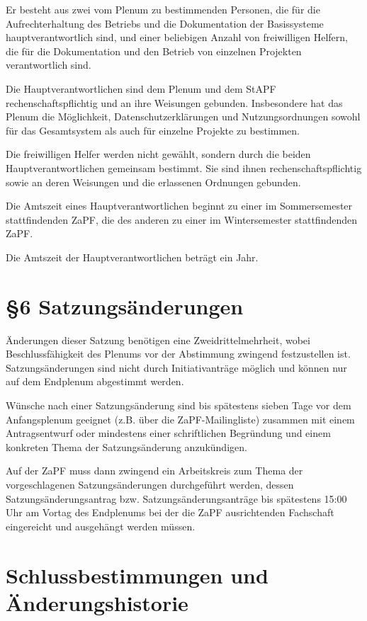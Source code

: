 \documentclass[12pt,oneside]{scrartcl}
\begin{document}
Er besteht aus zwei vom Plenum zu bestimmenden Personen, die für die
Aufrechterhaltung des Betriebs und die Dokumentation der Basissysteme
hauptverantwortlich sind, und einer beliebigen Anzahl von freiwilligen Helfern,
die für die Dokumentation und den Betrieb von einzelnen Projekten verantwortlich
sind.

Die Hauptverantwortlichen sind dem Plenum und dem StAPF rechenschaftspflichtig
und an ihre Weisungen gebunden. Insbesondere hat das Plenum die Möglichkeit,
Datenschutzerklärungen und Nutzungsordnungen sowohl für das Gesamtsystem als
auch für einzelne Projekte zu bestimmen.

Die freiwilligen Helfer werden nicht gewählt, sondern durch die beiden
Hauptverantwortlichen gemeinsam bestimmt. Sie sind ihnen rechenschaftspflichtig
sowie an deren Weisungen und die erlassenen Ordnungen gebunden.

Die Amtszeit eines Hauptverantwortlichen beginnt zu einer im Sommersemester
stattfindenden ZaPF, die des anderen zu einer im Wintersemester stattfindenden
ZaPF.

Die Amtszeit der Hauptverantwortlichen beträgt ein Jahr.


\section{§6 Satzungsänderungen%
  \label{satzungsanderungen}%
}

Änderungen dieser Satzung benötigen eine Zweidrittelmehrheit, wobei Beschlussfähigkeit
des Plenums vor der Abstimmung zwingend festzustellen ist. Satzungsänderungen
sind nicht durch Initiativanträge möglich und können nur auf dem Endplenum
abgestimmt werden.

Wünsche nach einer Satzungsänderung sind bis spätestens sieben Tage vor dem
Anfangsplenum geeignet (z.B. über die ZaPF-Mailingliste)
zusammen mit einem Antragsentwurf oder mindestens einer schriftlichen
Begründung und einem konkreten Thema der Satzungsänderung anzukündigen.

Auf der ZaPF muss dann zwingend ein Arbeitskreis zum Thema der vorgeschlagenen
Satzungsänderungen durchgeführt werden, dessen Satzungsänderungsantrag bzw.
Satzungsänderungsanträge bis spätestens 15:00 Uhr am Vortag des Endplenums bei
der die ZaPF ausrichtenden Fachschaft eingereicht und ausgehängt werden müssen.


\section{Schlussbestimmungen und Änderungshistorie%
  \label{schlussbestimmungen-und-anderungshistorie}%
}
\end{document}
